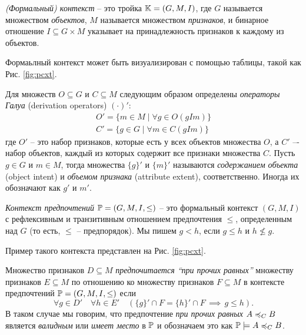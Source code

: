 		
		\begin{definition}
		\label{def:context}
			\emph{(Формальный) контекст} – это тройка $\mathbb{K} = (G, M, I)$, где $G$ называется множеством \emph{объектов}, $M$ называется множеством \emph{признаков}, и бинарное отношение ${I \subseteq G \times M}$ указывает на принадлежность признаков к каждому из объектов.
		\end{definition}
		
		Формаьлный контекст может быть визуализирован с помощью таблицы, такой как Рис. \ref{fig:pcxt}.
		
		Для множеств $O \subseteq G$ и $C \subseteq M$ следующим образом определены \emph{операторы Галуа} (derivation operators) $(\cdot)'$:
		\begin{subequations}
			\begin{gather}
			\label{eq:object_intent}
			O'=\{m \in M \mid \forall g \in O (g I m)\}  \\ 
			\label{eq:attribute_extent}
			C'=\{g \in G \mid \forall m \in C (g I m)\}
			\end{gather}
		\end{subequations}
		где $O'$ – это набор признаков, которые есть у всех объектов множества $O$, а $C'$  –- набор объектов, каждый из которых содержит все признаки множества $C$. Пусть $g \in G$ и $m \in M$, тогда множества $\{g\}'$ и $\{m\}'$ называются \emph{содержанием объекта} (object intent) и \emph{объемом признака} (attribute extent), соответственно. Иногда их обозначают как $g'$ и $m'$.
		
		\begin{definition}
		\label{def:preference_context}
			\emph{Контекст предпочтений} $\mathbb{P} = (G, M, I, \leq)$ – это формальный контекст $(G, M, I)$ с рефлексивным и транзитивным отношением предпочтения $\leq$, определенным над $G$ (то есть, $\leq$ – предпорядок). Мы пишем $g < h$, если $g \leq h$ и $h \not\leq g$.
		\end{definition}
		Пример такого контекста представлен на Рис. \ref{fig:pcxt}.
		
		\begin{definition}
		\label{def:ceteris_paribus}
			Множество признаков $D \subseteq M$ \emph{предпочитается \enquote{при прочих равных}} множеству признаков $E \subseteq M$ по отношению ко множеству признаков $F \subseteq M$ в контексте предпочтений $\mathbb{P} = (G, M, I, \leq)$ если 
			\begin{equation}
			\forall g \in D' \quad \forall h \in E' \quad (\{g\}' \cap F = \{h\}' \cap F \, \implies \, g \leq h).
			\end{equation}
			В таком случае мы говорим, что предпочтение \emph{при прочих равных} $A \preccurlyeq_{C} B$ является \emph{валидным} или \emph{имеет место} в $\mathbb{P}$ и обозначаем это как $\mathbb{P} \models A \preccurlyeq_{C} B$.
		\end{definition}
	
